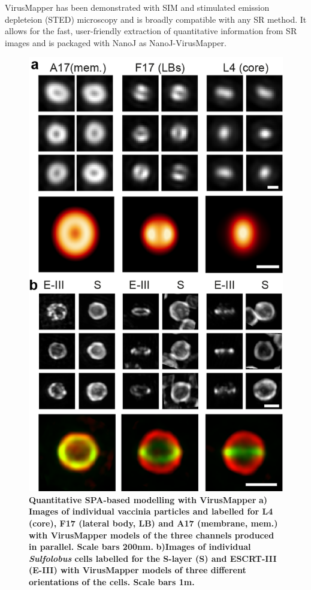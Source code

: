 VirusMapper has been demonstrated with SIM and stimulated emission depleteion (STED) microscopy \cite{Gray2016} and is broadly compatible with any SR method. It allows for the fast, user-friendly extraction of quantitative information from SR images and is packaged with NanoJ as NanoJ-VirusMapper.

\begin{figure}[!t]
    \centering
    \includegraphics[width=\linewidth]{Figures/NanoJ_VirusMapperFigure_rot.png}
    \caption{\textbf{Quantitative SPA-based modelling with VirusMapper} \textbf{a) Images of individual vaccinia particles and labelled for L4 (core), F17 (lateral body, LB) and A17 (membrane, mem.) with VirusMapper models of the three channels produced in parallel. Scale bars 200nm.} \textbf{b)Images of individual \emph{Sulfolobus} cells labelled for the S-layer (S) and ESCRT-III (E-III) with VirusMapper models of three different orientations of the cells. Scale bars 1\micro m. }}
    \label{fig:VirusMapper}
\end{figure}


